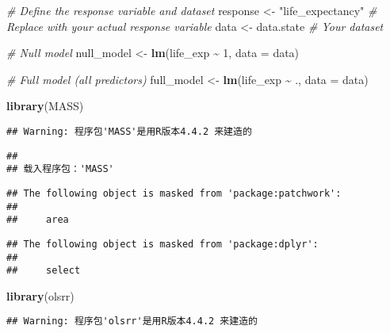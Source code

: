 \documentclass[
]{article}
\newenvironment{Shaded}{\begin{snugshade}}{\end{snugshade}}
\newcommand{\AttributeTok}[1]{\textcolor[rgb]{0.13,0.29,0.53}{#1}}
\newcommand{\CommentTok}[1]{\textcolor[rgb]{0.56,0.35,0.01}{\textit{#1}}}
\newcommand{\DecValTok}[1]{\textcolor[rgb]{0.00,0.00,0.81}{#1}}
\newcommand{\FunctionTok}[1]{\textcolor[rgb]{0.13,0.29,0.53}{\textbf{#1}}}
\newcommand{\NormalTok}[1]{#1}
\newcommand{\OtherTok}[1]{\textcolor[rgb]{0.56,0.35,0.01}{#1}}
\newcommand{\SpecialCharTok}[1]{\textcolor[rgb]{0.81,0.36,0.00}{\textbf{#1}}}
\newcommand{\StringTok}[1]{\textcolor[rgb]{0.31,0.60,0.02}{#1}}
\begin{document}
\begin{Shaded}
\begin{Highlighting}[]
\CommentTok{\# Define the response variable and dataset}
\NormalTok{response }\OtherTok{\textless{}{-}} \StringTok{"life\_expectancy"}  \CommentTok{\# Replace with your actual response variable}
\NormalTok{data }\OtherTok{\textless{}{-}}\NormalTok{ data.state            }\CommentTok{\# Your dataset}

\CommentTok{\# Null model}
\NormalTok{null\_model }\OtherTok{\textless{}{-}} \FunctionTok{lm}\NormalTok{(life\_exp }\SpecialCharTok{\textasciitilde{}} \DecValTok{1}\NormalTok{, }\AttributeTok{data =}\NormalTok{ data)}

\CommentTok{\# Full model (all predictors)}
\NormalTok{full\_model }\OtherTok{\textless{}{-}} \FunctionTok{lm}\NormalTok{(life\_exp }\SpecialCharTok{\textasciitilde{}}\NormalTok{ ., }\AttributeTok{data =}\NormalTok{ data)}
\end{Highlighting}
\end{Shaded}

\begin{Shaded}
\begin{Highlighting}[]
\FunctionTok{library}\NormalTok{(MASS)}
\end{Highlighting}
\end{Shaded}

\begin{verbatim}
## Warning: 程序包'MASS'是用R版本4.4.2 来建造的
\end{verbatim}

\begin{verbatim}
## 
## 载入程序包：'MASS'
\end{verbatim}

\begin{verbatim}
## The following object is masked from 'package:patchwork':
## 
##     area
\end{verbatim}

\begin{verbatim}
## The following object is masked from 'package:dplyr':
## 
##     select
\end{verbatim}

\begin{Shaded}
\begin{Highlighting}[]
\FunctionTok{library}\NormalTok{(olsrr)}
\end{Highlighting}
\end{Shaded}

\begin{verbatim}
## Warning: 程序包'olsrr'是用R版本4.4.2 来建造的
\end{verbatim}
\end{document}
